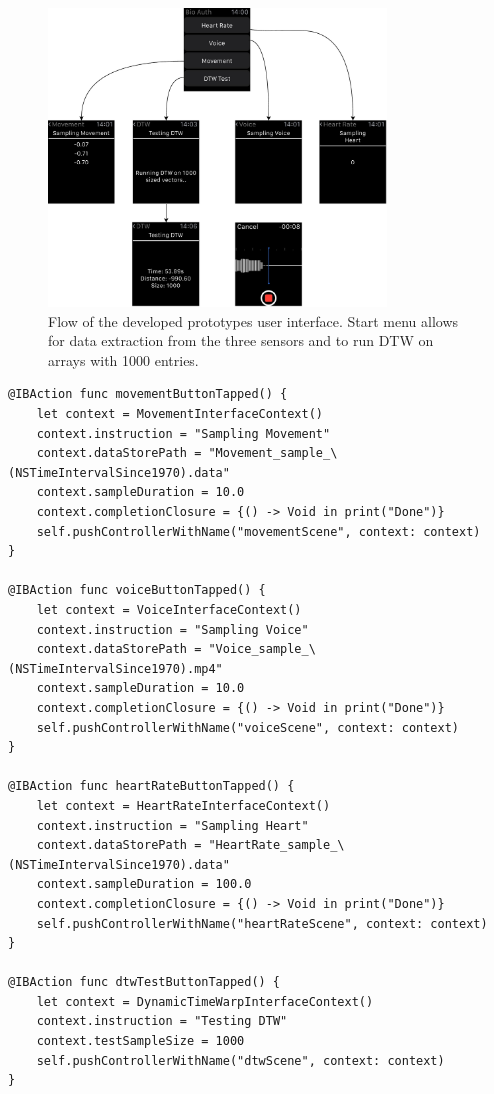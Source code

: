 \begin{figure}[!h]
\centering
\includegraphics[width=0.8\textwidth]{../media/bioswp_ui.pdf}
\caption{Flow of the developed prototypes user interface. Start menu allows for
data extraction from the three sensors and to run DTW on arrays with 1000
    entries.}
\label{fig:ui}
\end{figure}

\begin{lstlisting}[label={lst:ui}, caption={Spawning of ViewControllers from the
main interface, passing contexts setting up the sampling.},basicstyle=\small]
@IBAction func movementButtonTapped() {
    let context = MovementInterfaceContext()
    context.instruction = "Sampling Movement"
    context.dataStorePath = "Movement_sample_\(NSTimeIntervalSince1970).data"
    context.sampleDuration = 10.0
    context.completionClosure = {() -> Void in print("Done")}
    self.pushControllerWithName("movementScene", context: context)
}

@IBAction func voiceButtonTapped() {
    let context = VoiceInterfaceContext()
    context.instruction = "Sampling Voice"
    context.dataStorePath = "Voice_sample_\(NSTimeIntervalSince1970).mp4"
    context.sampleDuration = 10.0
    context.completionClosure = {() -> Void in print("Done")}
    self.pushControllerWithName("voiceScene", context: context)
}

@IBAction func heartRateButtonTapped() {
    let context = HeartRateInterfaceContext()
    context.instruction = "Sampling Heart"
    context.dataStorePath = "HeartRate_sample_\(NSTimeIntervalSince1970).data"
    context.sampleDuration = 100.0
    context.completionClosure = {() -> Void in print("Done")}
    self.pushControllerWithName("heartRateScene", context: context)
}

@IBAction func dtwTestButtonTapped() {
    let context = DynamicTimeWarpInterfaceContext()
    context.instruction = "Testing DTW"
    context.testSampleSize = 1000
    self.pushControllerWithName("dtwScene", context: context)
}
\end{lstlisting}



